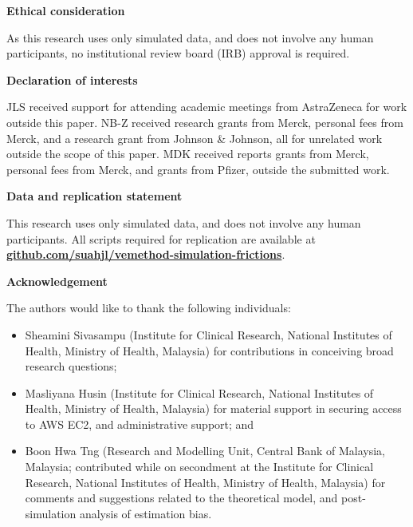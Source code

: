 \documentclass[12pt]{article}
\begin{document}
\newpage

\textbf{Ethical consideration}

As this research uses only simulated data, and does not involve any human participants, no institutional review board (IRB) approval is required.

\textbf{Declaration of interests}

JLS received support for attending academic meetings from AstraZeneca for work outside this paper. NB-Z received research grants from Merck, personal fees from Merck, and a research grant from Johnson \& Johnson, all for unrelated work outside the scope of this paper. MDK received reports grants from Merck, personal fees from Merck, and grants from Pfizer, outside the submitted work.

\textbf{Data and replication statement} 

This research uses only simulated data, and does not involve any human participants. All scripts required for replication are available at \href{https://github.com/suahjl/vemethod-simulation-frictions}{\textbf{github.com/suahjl/vemethod-simulation-frictions}}.

\textbf{Acknowledgement}

The authors would like to thank the following individuals: 
\begin{itemize}
	\item Sheamini Sivasampu (Institute for Clinical Research, National Institutes of Health, Ministry of Health, Malaysia) for contributions in conceiving broad research questions;
	\item Masliyana Husin (Institute for Clinical Research, National Institutes of Health, Ministry of Health, Malaysia) for material support in securing access to AWS EC2, and administrative support; and
	\item Boon Hwa Tng (Research and Modelling Unit, Central Bank of Malaysia, Malaysia; contributed while on secondment at the Institute for Clinical Research, National Institutes of Health, Ministry of Health, Malaysia) for comments and suggestions related to the theoretical model, and post-simulation analysis of estimation bias.
\end{itemize}

\newpage



\newpage
\appendix
{}
\end{document}
